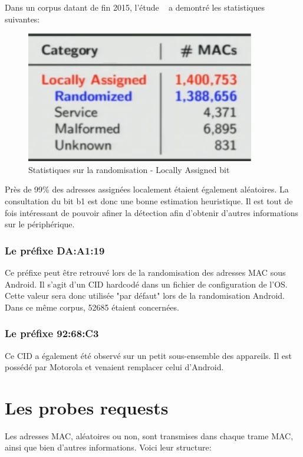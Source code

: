 Dans un corpus datant de fin 2015, l'étude ~\cite{ASMARMD} a demontré les statistiques suivantes: 

\begin{figure}[H]
	\centering
	\includegraphics[width=10cm]{images/probe/stats_locally_assigned.png}
	\caption{Statistiques sur la randomisation - Locally Assigned bit}
	\label{fig:macstruct}
\end{figure}

Près de 99\% des adresses assignées localement étaient également aléatoires. La consultation
du bit b1 est donc une bonne estimation heuristique. Il est tout de fois intéressant de pouvoir afiner
la détection afin d'obtenir d'autres informations sur le périphérique. 

\subsubsection{Le préfixe DA:A1:19}
Ce préfixe peut être retrouvé lors de la randomisation des adresses MAC sous Android.
Il s'agit d'un CID hardcodé dans un fichier de configuration de l'OS. Cette valeur sera donc utilisée "par défaut"
lors de la randomisation Android. Dans ce même corpus, 52685 étaient concernées.

\subsubsection{Le préfixe 92:68:C3}
Ce CID a également été observé sur un petit sous-ensemble des appareils. Il est possédé par Motorola et venaient remplacer
celui d'Android.

\section{Les probes requests}

Les adresses MAC, aléatoires ou non, sont transmises dans chaque trame MAC, ainsi que bien d'autres
informations. Voici leur structure:

